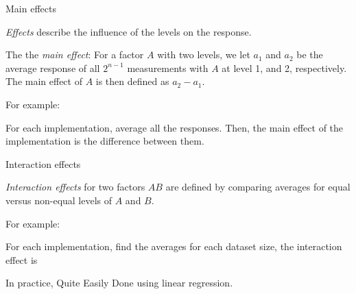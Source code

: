 \documentclass[english,handout,aspectratio=169]{ifislide}
\begin{document}
\begin{frame}{Main effects}

\emph{Effects} describe the influence of the levels on the response.

The the \emph{main effect}: For a factor $A$ with two levels, we let
$a_1$ and $a_2$ be the average response of all $2^{n-1}$ measurements
with $A$ at level 1, and 2, respectively.  The main effect of $A$ is
then defined as $a_2 - a_1$.

For example: 

For each implementation, average all the responses. Then, the main
effect of the implementation is the difference between them.

\end{frame}

\begin{frame}{Interaction effects}

\emph{Interaction effects} for two factors $AB$ are defined
by comparing averages for equal versus non-equal levels of $A$ and
$B$. 

For example:

For each implementation, find the averages for each dataset size, the
interaction effect is %


In practice, Quite Easily Done using linear regression.
\end{frame}
\end{document}
